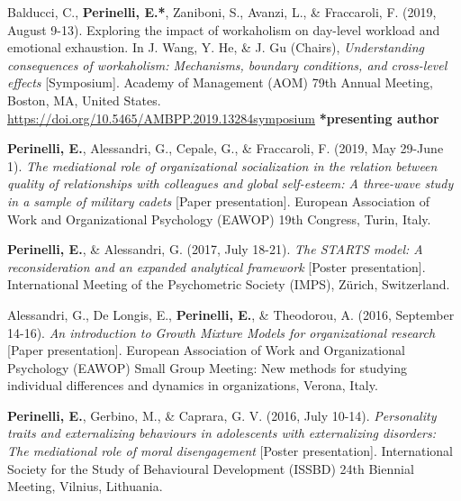 \documentclass[hidelinks, letterpaper,10pt]{article} %
\begin{document}
\begin{etaremune}
    \item Balducci, C., \textbf{Perinelli, E.*}, Zaniboni, S., Avanzi, L., \& Fraccaroli, F. (2019, August 9-13). Exploring the impact of workaholism on day-level workload and emotional exhaustion. In J. Wang, Y. He, \& J. Gu (Chairs), \textit{Understanding consequences of workaholism: Mechanisms, boundary conditions, and cross-level effects} [Symposium]. Academy of Management (AOM) 79th Annual Meeting, Boston, MA, United States. \url{https://doi.org/10.5465/AMBPP.2019.13284symposium}   \textbf{*presenting author}

    \item \textbf{Perinelli, E.}, Alessandri, G., Cepale, G., \& Fraccaroli, F. (2019, May 29-June 1). \textit{The mediational role of organizational socialization in the relation between quality of relationships with colleagues and global self-esteem: A three-wave study in a sample of military cadets} [Paper presentation]. European Association of Work and Organizational Psychology (EAWOP) 19th Congress, Turin, Italy.

    \item \textbf{Perinelli, E.}, \& Alessandri, G. (2017, July 18-21). \textit{The STARTS model: A reconsideration and an expanded analytical framework} [Poster presentation]. International Meeting of the Psychometric Society (IMPS), Zürich, Switzerland.

    \item Alessandri, G., De Longis, E., \textbf{Perinelli, E.}, \& Theodorou, A. (2016, September 14-16). \textit{An introduction to Growth Mixture Models for organizational research} [Paper presentation]. European Association of Work and Organizational Psychology (EAWOP) Small Group Meeting: New methods for studying individual differences and dynamics in organizations, Verona, Italy.

    \item \textbf{Perinelli, E.}, Gerbino, M., \& Caprara, G. V. (2016, July 10-14). \textit{Personality traits and externalizing behaviours in adolescents with externalizing disorders: The mediational role of moral disengagement} [Poster presentation]. International Society for the Study of Behavioural Development (ISSBD) 24th Biennial Meeting, Vilnius, Lithuania.
\end{etaremune}
\vspace{3mm}
\end{document}
